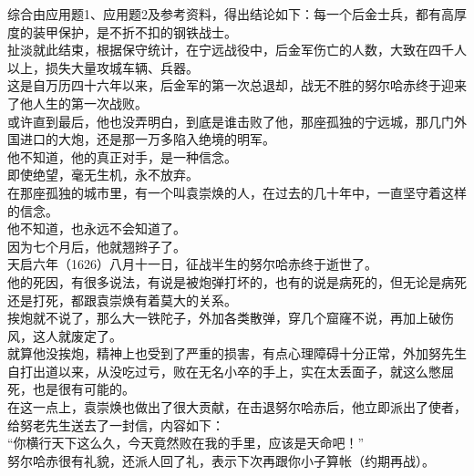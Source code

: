 \begin{multicols}{\theparacolNo}
综合由应用题1、应用题2及参考资料，得出结论如下：每一个后金士兵，都有高厚度的装甲保护，是不折不扣的钢铁战士。\\

扯淡就此结束，根据保守统计，在宁远战役中，后金军伤亡的人数，大致在四千人以上，损失大量攻城车辆、兵器。\\

这是自万历四十六年以来，后金军的第一次总退却，战无不胜的努尔哈赤终于迎来了他人生的第一次战败。\\

或许直到最后，他也没弄明白，到底是谁击败了他，那座孤独的宁远城，那几门外国进口的大炮，还是那一万多陷入绝境的明军。\\

他不知道，他的真正对手，是一种信念。\\

即使绝望，毫无生机，永不放弃。\\

在那座孤独的城市里，有一个叫袁崇焕的人，在过去的几十年中，一直坚守着这样的信念。\\

他不知道，也永远不会知道了。\\

因为七个月后，他就翘辫子了。\\

天启六年（1626）八月十一日，征战半生的努尔哈赤终于逝世了。\\

他的死因，有很多说法，有说是被炮弹打坏的，也有的说是病死的，但无论是病死还是打死，都跟袁崇焕有着莫大的关系。\\

挨炮就不说了，那么大一铁陀子，外加各类散弹，穿几个窟窿不说，再加上破伤风，这人就废定了。\\

就算他没挨炮，精神上也受到了严重的损害，有点心理障碍十分正常，外加努先生自打出道以来，从没吃过亏，败在无名小卒的手上，实在太丢面子，就这么憋屈死，也是很有可能的。\\

在这一点上，袁崇焕也做出了很大贡献，在击退努尔哈赤后，他立即派出了使者，给努老先生送去了一封信，内容如下：\\

“你横行天下这么久，今天竟然败在我的手里，应该是天命吧！”\\

努尔哈赤很有礼貌，还派人回了礼，表示下次再跟你小子算帐（约期再战）。\\


\end{multicols}
